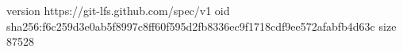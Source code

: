 version https://git-lfs.github.com/spec/v1
oid sha256:f6c259d3e0ab5f8997c8ff60f595d2fb8336ec9f1718cdf9ee572afabfb4d63c
size 87528
